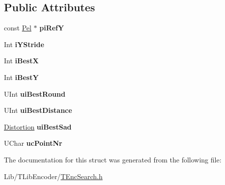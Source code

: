 \subsection*{Public Attributes}
\begin{DoxyCompactItemize}
\item 
\mbox{\label{struct_t_enc_search_1_1_int_t_z_search_struct_afc2170b14599ab7fddcf694e2f92e346}} 
const \hyperlink{_type_def_8h_af92141699657699b4b547be0c8517541}{Pel} $\ast$ {\bfseries pi\+RefY}
\item 
\mbox{\label{struct_t_enc_search_1_1_int_t_z_search_struct_abb59bd7931913de72e7ffb27ec981d5d}} 
Int {\bfseries i\+Y\+Stride}
\item 
\mbox{\label{struct_t_enc_search_1_1_int_t_z_search_struct_a5a8f5b6547df163b5461b3e668cf7b50}} 
Int {\bfseries i\+BestX}
\item 
\mbox{\label{struct_t_enc_search_1_1_int_t_z_search_struct_a5a3449eb12e4be90c41bf70256f5a92e}} 
Int {\bfseries i\+BestY}
\item 
\mbox{\label{struct_t_enc_search_1_1_int_t_z_search_struct_a7f0d20db5ff211b3526039bb84432155}} 
U\+Int {\bfseries ui\+Best\+Round}
\item 
\mbox{\label{struct_t_enc_search_1_1_int_t_z_search_struct_a32eb5dba242d71f1156b063bbab4458a}} 
U\+Int {\bfseries ui\+Best\+Distance}
\item 
\mbox{\label{struct_t_enc_search_1_1_int_t_z_search_struct_a8a820a2b2483c40e25b652ec93e603fa}} 
\hyperlink{_type_def_8h_aed82b23ef6849d0bc3d95c92102d5b50}{Distortion} {\bfseries ui\+Best\+Sad}
\item 
\mbox{\label{struct_t_enc_search_1_1_int_t_z_search_struct_a73dadd6074fef3e5876831dd237228e4}} 
U\+Char {\bfseries uc\+Point\+Nr}
\end{DoxyCompactItemize}


The documentation for this struct was generated from the following file\+:\begin{DoxyCompactItemize}
\item 
Lib/\+T\+Lib\+Encoder/\hyperlink{_t_enc_search_8h}{T\+Enc\+Search.\+h}\end{DoxyCompactItemize}
